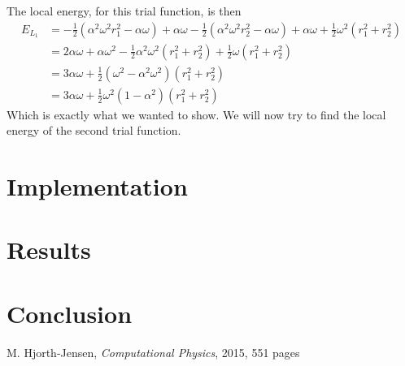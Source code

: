 \documentclass[12pt]{article}
\begin{document}
The local energy, for this trial function, is then
\begin{align*}
E_{L_1} &= -\frac{1}{2} (\alpha^2 \omega^2 r_1^2 - \alpha \omega) + \alpha \omega - \frac{1}{2} (\alpha^2 \omega^2 r_2^2 - \alpha \omega) + \alpha \omega + \frac{1}{2}\omega^2(r_1^2 + r_2^2) \\
&= 2 \alpha \omega + \alpha \omega^2 - \frac{1}{2}\alpha^2 \omega^2 (r_1^2 + r_2^2) + \frac{1}{2}\omega(r_1^2 + r_2^2) \\
&= 3\alpha \omega + \frac{1}{2}(\omega^2 - \alpha^2 \omega^2)(r_1^2 + r_2^2) \\
&= 3 \alpha \omega +  \frac{1}{2}\omega^2(1-\alpha^2)(r_1^2 + r_2^2)
\end{align*}
Which is exactly what we wanted to show. We will now try to find the local energy of the second trial function. 
\section{Implementation} \label{section:implement}

\section{Results}\label{section:results}

\section{Conclusion}\label{section:conclusion}

\FloatBarrier
\begin{thebibliography}{1}
     M. Hjorth-Jensen, \emph{Computational Physics}, 2015, 551 pages
\end{thebibliography}
\end{document}
